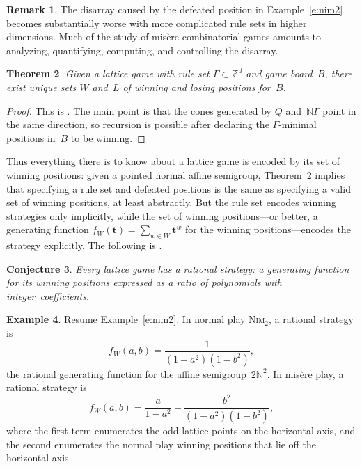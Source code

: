 \documentclass[12pt]{amsart}
\numberwithin{equation}{section}
\newtheorem{thm}{Theorem}[section]
\newtheorem{conj}[thm]{Conjecture}
\theoremstyle{definition}
\newtheorem{remark}[thm]{Remark}
\newtheorem{example}[thm]{Example}
\begin{document}
\begin{remark}
The disarray caused by the defeated position in Example~\ref{e:nim2}
becomes substantially worse with more complicated rule sets in higher
dimensions.  Much of the study of mis\`ere combinatorial games amounts
to analyzing, quantifying, computing, and controlling the disarray.
\end{remark}

\begin{thm}\label{t:uniqueness}
Given a lattice game with rule set $\Gamma \subset {\mathbb{Z}}^d$ and game
board~$B$, there exist unique sets $W$ and~$L$ of winning and losing
positions for~$B$.
\end{thm}
\begin{proof}
This is \cite[Theorem~4.6]{latticeGames}.  The main point is that the
cones generated by $Q$ and~${\mathbb{N}}\Gamma$ point in the same direction, so
recursion is possible after declaring the $\Gamma$-minimal positions
in~$B$ to be winning.
\end{proof}

Thus everything there is to know about a lattice game is encoded by
its set of winning positions: given a pointed normal affine semigroup,
Theorem~\ref{t:uniqueness} implies that specifying a rule set and
defeated positions is the same as specifying a valid set of winning
positions, at least abstractly.  But the rule set encodes winning
strategies only implicitly, while the set of winning positions---or
better, a generating function $f_W({\mathbf{t}}) = \sum_{w \in W} {\mathbf{t}}^w$ for
the winning positions---encodes the strategy explicitly.  The
following is \cite[Conjecture~8.5]{latticeGames}.

\begin{conj}\label{c:latticeGames}
Every lattice game has a \emph{rational strategy}: a generating
function for its winning positions expressed as a ratio of polynomials
with integer~coefficients.
\end{conj}

\begin{example}\label{e:nim2'}
Resume Example~\ref{e:nim2}.  In normal play {\textsc{Nim}}$_2$, a rational
strategy is
$$  f_W(a,b) = \frac{1}{(1-a^2)(1-b^2)},
$$
the rational generating function for the affine semigroup~$2{\mathbb{N}}^2$.
In mis\`ere play, a rational strategy is
$$  f_W(a,b) = \frac{a}{1-a^2} + \frac{b^2}{(1-a^2)(1-b^2)},
$$
where the first term enumerates the odd lattice points on the
horizontal axis, and the second enumerates the normal play winning
positions that lie off the horizontal axis.
\end{example}
\end{document}
